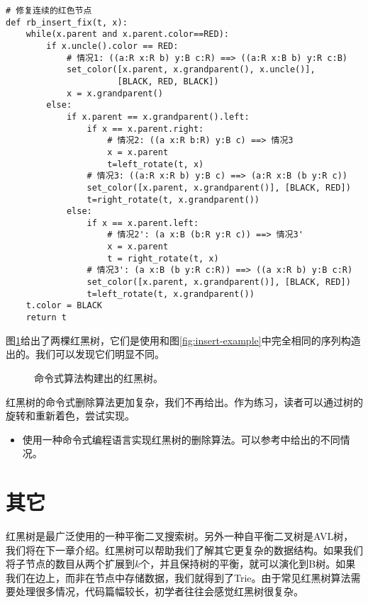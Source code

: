 \documentclass[UTF8]{article}
\begin{document}
\lstset{language=Python}
\begin{lstlisting}
# 修复连续的红色节点
def rb_insert_fix(t, x):
    while(x.parent and x.parent.color==RED):
        if x.uncle().color == RED:
            # 情况1: ((a:R x:R b) y:B c:R) ==> ((a:R x:B b) y:R c:B)
            set_color([x.parent, x.grandparent(), x.uncle()],
                      [BLACK, RED, BLACK])
            x = x.grandparent()
        else:
            if x.parent == x.grandparent().left:
                if x == x.parent.right:
                    # 情况2: ((a x:R b:R) y:B c) ==> 情况3
                    x = x.parent
                    t=left_rotate(t, x)
                # 情况3: ((a:R x:R b) y:B c) ==> (a:R x:B (b y:R c))
                set_color([x.parent, x.grandparent()], [BLACK, RED])
                t=right_rotate(t, x.grandparent())
            else:
                if x == x.parent.left:
                    # 情况2': (a x:B (b:R y:R c)) ==> 情况3'
                    x = x.parent
                    t = right_rotate(t, x)
                # 情况3': (a x:B (b y:R c:R)) ==> ((a x:R b) y:B c:R)
                set_color([x.parent, x.grandparent()], [BLACK, RED])
                t=left_rotate(t, x.grandparent())
    t.color = BLACK
    return t
\end{lstlisting}

图\ref{fig:imperative-insert}给出了两棵红黑树，它们是使用和图\ref{fig:insert-example}中完全相同的序列构造出的。我们可以发现它们明显不同。

\begin{figure}[htbp]
   \centering
   \caption{命令式算法构建出的红黑树。}
   \label{fig:imperative-insert}
\end{figure}

红黑树的命令式删除算法更加复杂，我们不再给出。作为练习，读者可以通过树的旋转和重新着色，尝试实现。

\begin{Exercise}

\begin{itemize}
\item 使用一种命令式编程语言实现红黑树的删除算法。可以参考\cite{CLRS}中给出的不同情况。
\end{itemize}

\end{Exercise}

\section{其它}
红黑树是最广泛使用的一种平衡二叉搜索树。另外一种自平衡二叉树是AVL树，我们将在下一章介绍。红黑树可以帮助我们了解其它更复杂的数据结构。如果我们将子节点的数目从两个扩展到$k$个，并且保持树的平衡，就可以演化到B树。如果我们在边上，而非在节点中存储数据，我们就得到了Trie。由于常见红黑树算法需要处理很多情况，代码篇幅较长，初学者往往会感觉红黑树很复杂。
\end{document}
